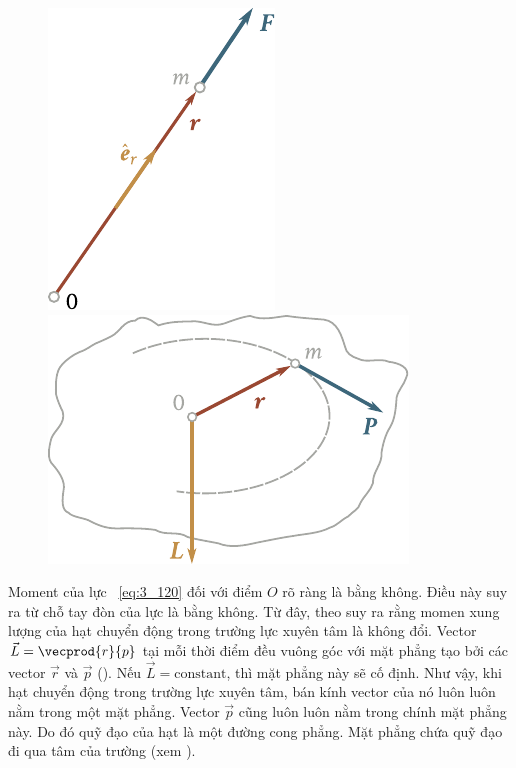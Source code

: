 \begin{figure}[!htb]
	\hspace{-0.5cm}
	\begin{minipage}[t]{0.5\linewidth}
		\begin{center}
			\includegraphics[scale=0.9]{figures/ch_03/fig_3_24.pdf}
			\caption[]{}
			\label{fig:3_24}
		\end{center}
	\end{minipage}
	\hspace{-0.5cm}
	\begin{minipage}[t]{0.5\linewidth}
		\begin{center}
			\includegraphics[scale=0.95]{figures/ch_03/fig_3_25.pdf}
			\caption[]{}
			\label{fig:3_25}
		\end{center}
	\end{minipage}
\end{figure}

Moment của lực ~\eqref{eq:3_120} đối với điểm $O$ rõ ràng là bằng không. Điều này suy ra từ chỗ tay đòn của lực  là bằng không. Từ đây, theo  suy ra rằng momen xung lượng của hạt chuyển động trong trường lực xuyên tâm là không đổi. Vector $\vec{L}=\vecprod{r}{p}$ tại mỗi thời điểm đều vuông góc với mặt phẳng tạo bởi các vector $\vec{r}$ và $\vec{p}$ (). Nếu  $\vec{L}=\text{constant}$, thì mặt phẳng này sẽ cố định. Như vậy, khi hạt chuyển động trong trường lực xuyên tâm, bán kính vector của nó luôn luôn nằm trong một mặt phẳng. Vector $\vec{p}$ cũng luôn luôn nằm trong chính mặt phẳng này. Do đó quỹ đạo của hạt là một đường cong phẳng. Mặt phẳng chứa quỹ đạo đi qua tâm của trường (xem ).

